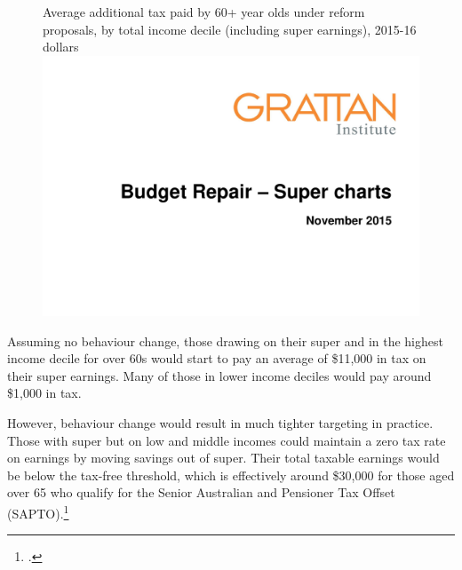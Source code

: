 \begin{figure}
%
{Average additional tax paid by 60+ year olds under reform proposals, by total income decile (including super earnings), 2015-16 dollars}
\includegraphics[width=\columnwidth,page=32]{super-atlas/PPTX.pdf}

\end{figure} 

Assuming no behaviour change, those drawing on their super and in the highest income decile for over 60s would start to pay an average of \$11,000 in tax on their super earnings. Many of those in lower income deciles would pay around \$1,000 in tax.

However, behaviour change would result in much tighter targeting in practice. Those with super but on low and middle incomes could maintain a zero tax rate on earnings by moving savings out of super. Their total taxable earnings would be below the tax-free threshold, which is effectively around \$30,000 for those aged over 65 who qualify for the Senior Australian and Pensioner Tax Offset (SAPTO).\footcite{ATO2015-Beneficiary-tax-offset-sapto-calculator}  

